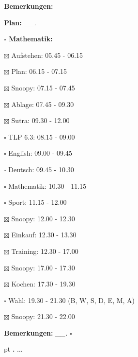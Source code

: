 \documentclass[10pt,a4paper]{article}
\newcounter{notec}
\newcommand\notep[1]{%
  \stepcounter{notec}
  \vskip #1pt
  {\bf\arabic{notec}.}
}
\newcommand\prop[1] {{\color {alizarin} {\bf #1}}}             %
\newcommand\draf[1] {{\color {amber(sae/ece)} {\bf #1}}}       %
\newcommand\mand[1] {{\color {burntorange} {\bf #1}}}          %
\newcommand\topspace{\vskip -15pt \hskip 20pt}
\newcommand\bottomspace{\vskip 4pt}
\newcommand\n[1] { {\sl #1.} \hskip 5pt }
\begin{document}
\begin{mdframed}[style=daystyle]
\begin{labeling}{{\mand {Bemerkungen:}}}
  \item[{\mand {Plan:}}]         \n{\_\_}
    \topspace
    \begin{minipage}{0.75\textwidth}  
      \begin{labeling}{\prop {$\square$ {Mathematik:}}} 
        \setlength\itemsep{-3pt}
      \item[$\boxtimes$ Aufstehen:]  05.45 - 06.15
      \item[$\boxtimes$ Plan:]       06.15 - 07.15
        
      \item[$\boxtimes$ Snoopy:]     07.15 - 07.45
      \item[$\boxtimes$ Ablage:]     07.45 - 09.30
      \item[$\boxtimes$ Sutra:]      09.30 - 12.00        
      \item[$\square$ TLP 6.3:]    08.15 - 09.00
      \item[$\square$ English:]    09.00 - 09.45
      \item[$\square$ Deutsch:]    09.45 - 10.30
      \item[$\square$ Mathematik:] 10.30 - 11.15        
      \item[$\square$ Sport:]      11.15 - 12.00
        
      \item[$\boxtimes$ Snoopy:]     12.00 - 12.30
      \item[$\boxtimes$ Einkauf:]    12.30 - 13.30        
      \item[$\boxtimes$ Training:]   12.30 - 17.00
        
      \item[$\boxtimes$ Snoopy:]     17.00 - 17.30
      \item[$\boxtimes$ Kochen:]     17.30 - 19.30
      \item[$\square$ Wahl:]       19.30 - 21.30 (B, W, S, D, E, M, A)
      \item[$\boxtimes$ Snoopy:]     21.30 - 22.00
      \end{labeling}
    \end{minipage}
    \bottomspace
  \item[{\mand {Bemerkungen:}}]  \n{\_\_} {\draf {$\square$}}
  \end{labeling}
    
  \setcounter{notec}{0}
  
  \notep 0 $\ldots$

\end{mdframed}
\end{document}
